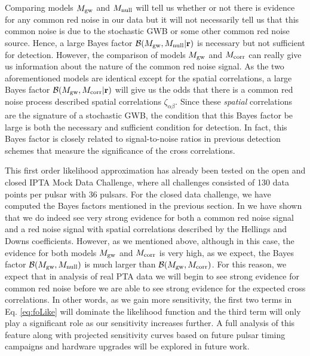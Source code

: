 \documentclass[iop]{emulateapj}
\begin{document}
 Comparing models $M_{\rm gw}$ and $M_{\rm null}$ will tell us whether or not there is evidence for any common red noise in our data but it will not necessarily tell us that this common noise is due to the stochastic GWB or some other common red noise source. Hence, a large Bayes factor $\mathcal{B}(M_{\rm gw},M_{\rm null}|\mathbf{r})$ is necessary but not sufficient for detection. However, the comparison of models $M_{\rm gw}$ and $M_{\rm corr}$ can really give us information about the nature of the common red noise signal. As the two aforementioned models are identical except for the spatial correlations, a large Bayes factor $\mathcal{B}(M_{\rm gw},M_{\rm corr}|\mathbf{r})$ will give us the odds that there is a common red noise process described spatial correlations  $\zeta_{\alpha\beta}$. Since these \emph{spatial} correlations are the signature of a stochastic GWB, the condition that this   Bayes factor be large is both the necessary and sufficient condition for detection. In fact, this Bayes factor is closely related to signal-to-noise ratios in previous detection schemes \citep{jhl+05,abc+09,ych+11,cce+12} that measure the significance of the cross correlations.
 
This first order likelihood approximation has already been tested on the open and closed \citep{esc12b} IPTA Mock Data Challenge, where all challenges consisted of 130 data points per pulsar with 36 pulsars. For the closed data challenge, we have computed the Bayes factors mentioned in the previous section. In \cite{esc12b} we have shown that we do indeed see very strong evidence for both a common red noise signal and a red noise signal with spatial correlations described by the Hellings and Downs coefficients. However, as we mentioned above, although in this case, the evidence for both models $M_{\rm gw}$ and $M_{\rm corr}$ is very high, as we expect, the Bayes factor $\mathcal{B}(M_{\rm gw},M_{\rm null})$ is much larger than $\mathcal{B}(M_{\rm gw},M_{\rm corr})$.  For this reason, we expect that in analysis of real PTA data we will begin to see strong evidence for common red noise before we are able to see strong evidence for the expected cross correlations. In other words, as we gain more sensitivity, the first two terms in Eq. \ref{eq:foLike} will dominate the likelihood function and the third term will only play a significant role as our sensitivity increases further. A full analysis of this feature along with projected sensitivity curves based on future pulsar timing campaigns and hardware upgrades will be explored in future work.
\end{document}
